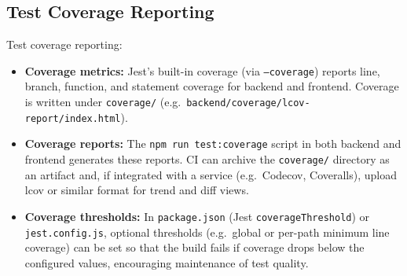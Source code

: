 \subsection{Test Coverage Reporting}
\label{subsec:test_coverage_reporting}%

Test coverage reporting:
\begin{itemize}
    \item \textbf{Coverage metrics:} Jest’s built-in coverage (via \texttt{--coverage}) reports line, branch, function, and statement coverage for backend and frontend. Coverage is written under \texttt{coverage/} (e.g.\ \texttt{backend/coverage/lcov-report/index.html}).
    \item \textbf{Coverage reports:} The \texttt{npm run test:coverage} script in both backend and frontend generates these reports. CI can archive the \texttt{coverage/} directory as an artifact and, if integrated with a service (e.g.\ Codecov, Coveralls), upload lcov or similar format for trend and diff views.
    \item \textbf{Coverage thresholds:} In \texttt{package.json} (Jest \texttt{coverageThreshold}) or \texttt{jest.config.js}, optional thresholds (e.g.\ global or per-path minimum line coverage) can be set so that the build fails if coverage drops below the configured values, encouraging maintenance of test quality.
\end{itemize}
